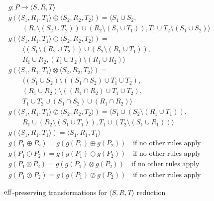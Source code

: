 \begin{figure}[t]
\centering
\begin{footnotesize}
\[
\begin{array}{l}
  g : P \rightarrow \langle S, R, T \rangle \\
  g (\langle S_1, R_1, T_1 \rangle \oplus \langle S_2, R_2, T_2 \rangle) = 
  \langle 
  S_1 \cup S_2, \\
  \qquad (R_1 \setminus (S_2 \cup T_2)) \cup (R_2 \setminus (S_1 \cup T_1)), 
  T_1 \cup T_2 \setminus (S_1 \cup S_2)
  \rangle \\
  g (\langle S_1, R_1, T_1 \rangle \ominus \langle S_2, R_2, T_2 \rangle)
  =  \\
  \qquad \langle (S_1 \setminus (R_2 \cup T_2)) \cup 
  (S_2 \setminus (R_1 \cup T_1)), \\
  \qquad
  R_1 \cup R_2,
  (T_1 \cup T_2) \setminus (R_1 \cup R_2)
  \rangle
  \\
  g (\langle S_1, R_1, T_1 \rangle \otimes \langle S_2, R_2, T_2 \rangle)
  = \\
  \qquad \langle 
  (S_1 \cup S_2) \setminus ((S_1 \cap S_2) \cup T_1 \cup T_2), \\
  \qquad
  (R_1 \cup R_2) \setminus ((R_1 \cap R_2) \cup T_1 \cup T_2), \\
  \qquad
  T_1 \cup T_2 \cup (S_1 \cap S_2) \cup (R_1 \cap R_2)
  \rangle 
  \\
  g (\langle S_1, R_1, T_1 \rangle \oslash \langle S_2, R_2, T_2 \rangle)
  = \langle 
  S_1 \cup (S_2 \setminus (R_1 \cup T_1)), \\
  \qquad 
  R_1 \cup (R_2 \setminus (S_1 \cup T_1)), 
  T_1 \cup (T_2 \setminus (S_1 \cup R_1))
  \rangle
  \\
  g (\langle S_1, R_1, T_1 \rangle) = \langle  S_1, R_1, T_1 \rangle 
  \\
  g (P_1 \oplus P_2) =  g (g (P_1) \oplus g (P_2)) \quad 
  \text{if no other rules apply}  \\
  g (P_1 \ominus P_2) =  g (g (P_1) \ominus g (P_2)) \quad 
  \text{if no other rules apply}  \\
  g (P_1 \otimes P_2) =  g (g (P_1) \otimes g (P_2)) \quad 
  \text{if no other rules apply}  \\
  g (P_1 \oslash P_2) =  g (g (P_1) \oslash g (P_2)) \quad
  \text{if no other rules apply} 
\end{array}
\]
\end{footnotesize}
\caption{$\operatorname{eff}$-preserving transformations for $\langle S, R, T \rangle$ 
  reduction}
\label{fig:triplereduction}
\end{figure}

